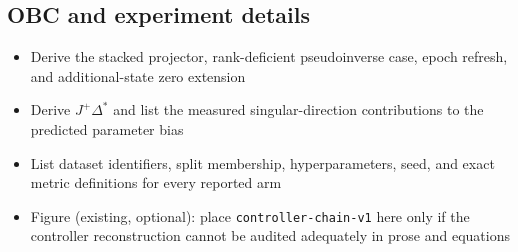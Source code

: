 \subsection{OBC and experiment details}
\begin{itemize}
\item Derive the stacked projector, rank-deficient pseudoinverse case, epoch refresh, and additional-state zero extension
\item Derive $J^+\Delta^*$ and list the measured singular-direction contributions to the predicted parameter bias
\item List dataset identifiers, split membership, hyperparameters, seed, and exact metric definitions for every reported arm
\item Figure (existing, optional): place \texttt{controller-chain-v1} here only if the controller reconstruction cannot be audited adequately in prose and equations
\end{itemize}
